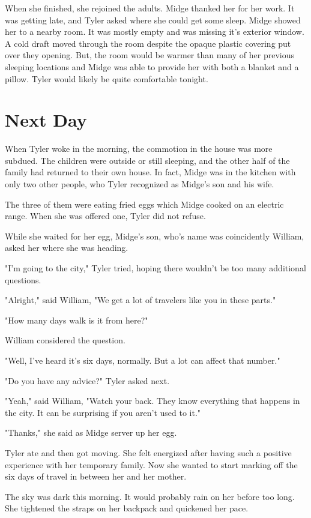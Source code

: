 \documentclass[courier]{sffms}
\begin{document}
When she finished, she rejoined the adults. Midge thanked her
for her work. It was getting late, and Tyler asked where she could
get some sleep. Midge showed her to a nearby room. It was mostly
empty and was missing it's exterior window. A cold draft moved
through the room despite the opaque plastic covering put over
they opening. But, the room would be warmer than many of her
previous sleeping locations and Midge was able to provide her with
both a blanket and a pillow. Tyler would likely be quite comfortable
tonight. 

\chapter{Next Day}
When Tyler woke in the morning, the commotion in the house
was more subdued. The children were outside or still sleeping,
and the other half of the family had returned to their own
house. In fact, Midge was in the kitchen with only two other
people, who Tyler recognized as Midge's son and his wife.

The three of them were eating fried eggs which Midge cooked on
an electric range. When she was offered one, Tyler did
not refuse.

While she waited for her egg, Midge's son, who's name was
coincidently William, asked her where she was heading.

"I'm going to the city," Tyler tried, hoping there wouldn't be
too many additional questions.

"Alright," said William, "We get a lot of travelers like you in
these parts."

"How many days walk is it from here?"

William considered the question.

"Well, I've heard it's six days, normally. But a lot can affect
that number."

"Do you have any advice?" Tyler asked next.

"Yeah," said William, "Watch your back. They know everything
that happens in the city. It can be surprising if you aren't
used to it."

"Thanks," she said as Midge server up her egg.

Tyler ate and then got moving. She felt energized after
having such a positive experience with her temporary
family. Now she wanted to start marking off the six
days of travel in between her and her mother.

The sky was dark this morning. It would probably rain
on her before too long. She tightened the straps on her
backpack and quickened her pace.
\end{document}
